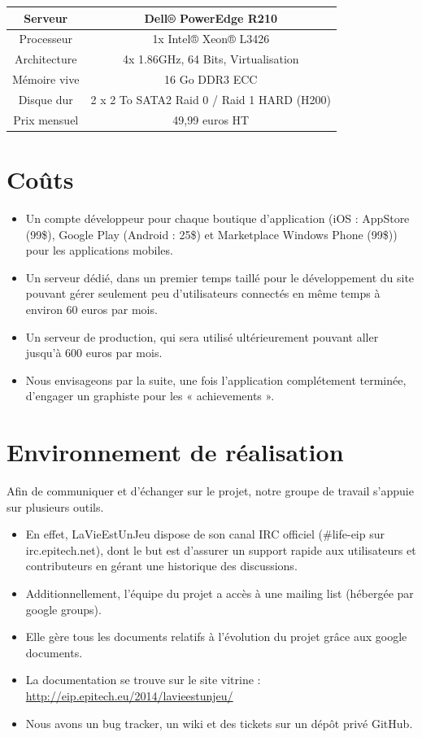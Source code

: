 \documentclass{life-fr}
\begin{document}
\vspace{20pt}

\begin{tabular}{|c|c|}
  \hline
   Serveur & Dell® PowerEdge R210\\
  \hline
  Processeur & 1x Intel® Xeon® L3426\\
  \hline
  Architecture & 4x 1.86GHz, 64 Bits, Virtualisation\\
  \hline
  Mémoire vive & 16 Go DDR3 ECC\\
  \hline
  Disque dur & 2 x 2 To SATA2 Raid 0 / Raid 1 HARD (H200)\\
  \hline
  Prix mensuel & 49,99 euros HT\\
  \hline
\end{tabular}

\vspace{20pt}

\section{Coûts}

\begin{itemize}
  \item Un compte développeur pour chaque boutique d'application (iOS : AppStore (99\$), Google Play (Android : 25\$) et Marketplace Windows Phone (99\$)) pour les applications mobiles.
  \item Un serveur dédié, dans un premier temps taillé pour le développement du site pouvant gérer seulement peu d'utilisateurs connectés en même temps à environ 60 euros par mois.
  \item Un serveur de production, qui sera utilisé ultérieurement pouvant aller jusqu'à 600 euros par mois.
  \item Nous envisageons par la suite, une fois l'application complétement terminée, d'engager un graphiste pour les « achievements ».
\end{itemize}

\section{Environnement de réalisation}

Afin de communiquer et d’échanger sur le projet, notre groupe de travail s’appuie sur plusieurs outils.

\begin{itemize}
  \item En effet, LaVieEstUnJeu dispose de son canal IRC officiel (\#life-eip sur irc.epitech.net), dont le but est d’assurer un support rapide aux utilisateurs et contributeurs en gérant une historique des discussions.
  \item Additionnellement, l’équipe du projet a accès à une mailing list (hébergée par google groups).
  \item Elle gère tous les documents relatifs à l’évolution du projet grâce aux google documents.
  \item La documentation se trouve sur le site vitrine : \url{http://eip.epitech.eu/2014/lavieestunjeu/}
  \item Nous avons un bug tracker, un wiki et des tickets sur un dépôt privé GitHub.
\end{itemize}
\end{document}
